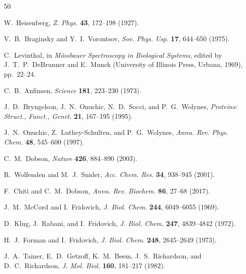 \documentclass[twocolumn,aps,prx,superscriptaddress,longbibliography]{revtex4-2}
\theoremstyle{remark}
\begin{document}
\begin{thebibliography}{50}


W.~Heisenberg,
\textit{Z. Phys.} \textbf{43}, 172--198 (1927).

V.~B.~Braginsky and Y.~I.~Vorontsov,
\textit{Sov. Phys. Usp.} \textbf{17}, 644--650 (1975).


C.~Levinthal, in \textit{M\"ossbauer Spectroscopy in Biological Systems},
edited by J.~T.~P.~DeBrunner and E.~Munck (University of Illinois Press,
Urbana, 1969), pp.~22--24.

C.~B.~Anfinsen,
\textit{Science} \textbf{181}, 223--230 (1973).

J.~D.~Bryngelson, J.~N.~Onuchic, N.~D.~Socci, and P.~G.~Wolynes,
\textit{Proteins: Struct., Funct., Genet.} \textbf{21}, 167--195 (1995).

J.~N.~Onuchic, Z.~Luthey-Schulten, and P.~G.~Wolynes,
\textit{Annu. Rev. Phys. Chem.} \textbf{48}, 545--600 (1997).

C.~M.~Dobson,
\textit{Nature} \textbf{426}, 884--890 (2003).


R.~Wolfenden and M.~J.~Snider,
\textit{Acc. Chem. Res.} \textbf{34}, 938--945 (2001).


F.~Chiti and C.~M.~Dobson,
\textit{Annu. Rev. Biochem.} \textbf{86}, 27--68 (2017).


J.~M.~McCord and I.~Fridovich,
\textit{J. Biol. Chem.} \textbf{244}, 6049--6055 (1969).

D.~Klug, J.~Rabani, and I.~Fridovich,
\textit{J. Biol. Chem.} \textbf{247}, 4839--4842 (1972).

H.~J.~Forman and I.~Fridovich,
\textit{J. Biol. Chem.} \textbf{248}, 2645--2649 (1973).

J.~A.~Tainer, E.~D.~Getzoff, K.~M.~Beem, J.~S.~Richardson, and
D.~C.~Richardson,
\textit{J. Mol. Biol.} \textbf{160}, 181--217 (1982).


\end{thebibliography}
\end{document}
